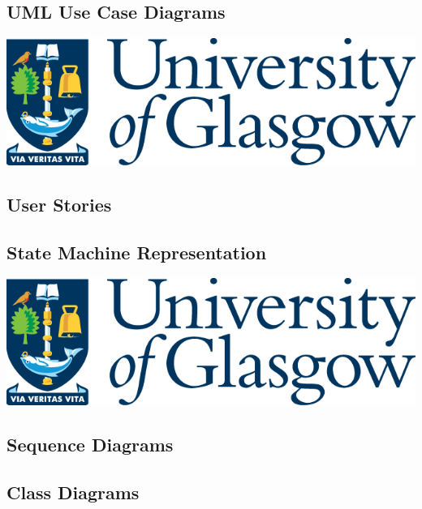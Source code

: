 \subsection{UML Use Case Diagrams}
\lipsum[10]

\includegraphics[width=\textwidth]{./images/UofG.png} %

\subsection{User Stories}
\lipsum[11]

\subsection{State Machine Representation}
\lipsum[12]

\includegraphics[width=\textwidth]{./images/UofG.png} %

\subsection{Sequence Diagrams}
\lipsum[13]

\subsection{Class Diagrams}
\lipsum[14]
